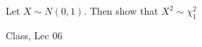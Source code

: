 \begin{samepage}
\begin{ex}
Let $X \sim N(0,1)$. Then show that $X^2 \sim \chi_1^2$
\end{ex}
\begin{source}
Class, Lec 06
\end{source}
\end{samepage}
